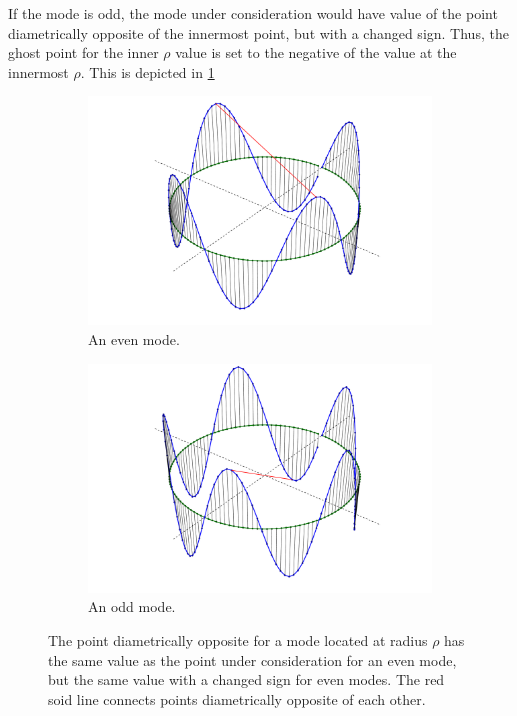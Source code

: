 If the mode is odd, the mode under consideration would have value of the point diametrically opposite of the innermost point, but with a changed sign.
Thus, the ghost point for the inner $\rho$ value is set to the negative of the value at the innermost $\rho$.
This is depicted in \cref{fig:BCLaplace}
%
\begin{figure}[h!]
    \centering
    \begin{subfigure}[t]{0.5\textwidth}
        \centering
        \includegraphics[width=1.0\textwidth]{fig/mode_4}
        \caption{An even mode.}
    \end{subfigure}%
    \hfill
    \begin{subfigure}[t]{0.5\textwidth}
        \centering
        \includegraphics[width=1.0\textwidth]{fig/mode_5}
        \caption{An odd mode.}
    \end{subfigure}
        \caption{The point diametrically opposite for a mode located at radius $\rho$ has the same value as the point under consideration for an even mode, but the same value with a changed sign for even modes.
        The red soid line connects points diametrically opposite of each other.}
    \label{fig:BCLaplace}
\end{figure}



